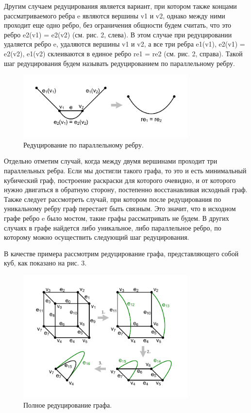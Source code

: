 Другим случаем редуцирования является вариант, при котором также концами рассматриваемого ребра e являются вершины v1 и v2, однако между ними проходит еще одно ребро, без ограничения общности будем считать, что это ребро e2(v1) = e2(v2) (см. рис. 2, слева).
В этом случае при редуцировании удаляется ребро e, удаляются вершины v1 и v2, а все три ребра e1(v1), e2(v1) = e2(v2), e1(v2) склеиваются в единое ребро re1 = re2 (см. рис. 2, справа).
Такой шаг редуцирования будем называть редуцированием по параллельному ребру.

\begin{figure}[ht]
	\centering
		\includegraphics[width=0.8\textwidth]{./pics/text_3_edge_coloring/2-pic-reduce-edge-type-2.pdf}
	\caption{Редуцирование по параллельному ребру.}
	\label{fig:text_3_edge_coloring_2}
\end{figure}

Отдельно отметим случай, когда между двумя вершинами проходит три параллельных ребра. Если мы достигли такого графа, то это и есть минимальный кубический граф, построение раскраски для которого очевидно, и от которого нужно двигаться в обратную сторону, постепенно восстанавливая исходный граф.
Также следует рассмотреть случай, при котором после редуцирования по уникальному ребру граф перестает быть связным.
Это значит, что в исходном графе ребро e было мостом, такие графы рассматривать не будем. В других случаях в графе найдется либо уникальное, либо параллельное ребро, по которому можно осуществить следующий шаг редуцирования.

В качестве примера рассмотрим редуцирование графа, представляющего собой куб, как показано на рис. 3.

\begin{figure}[ht]
	\centering
		\includegraphics[width=0.8\textwidth]{./pics/text_3_edge_coloring/3-reduce-0.pdf}
	\caption{Полное редуцирование графа.}
	\label{fig:text_3_edge_coloring_3}
\end{figure}

